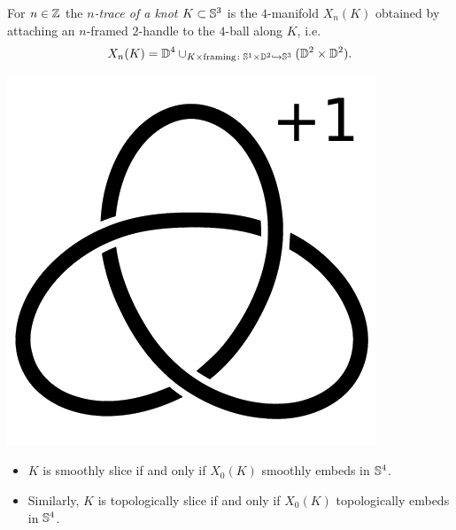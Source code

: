 \begin{definition}
	For $n \in \mathbb{Z}$ the \textit{$n$-trace of a knot} 
	$K \subset \mathbb{S}^{3}$
	is the $4$-manifold $X_{n}(K)$ obtained by attaching an $n$-framed $2$-handle to the $4$-ball along $K$,
	i.e. 
	\begin{equation*}
	X_{n}(K) = \mathbb{D}^{4} \cup_{K \times \textrm{framing} \colon \mathbb{S}^{1} \times \mathbb{D}^{2} \hookrightarrow \mathbb{S}^{3}} (\mathbb{D}^{2} \times \mathbb{D}^{2}).
	\end{equation*}
	
	\begin{marginfigure}
		\begin{center}
			\includegraphics[width=0.5\linewidth]{./pictures/right_handed_trefoil_+1_surgery.pdf}
		\end{center}
		\caption{
			A Kirby diagram for $X_{n}(K)$ is given just by the knot $K$ with the framing $n$ written next to it.
			For example, here is a Kirby diagram representing the $1$-trace
			$X_1(\textrm{right handed trefoil})$.
			The boundary of this $4$-manifold is the $+1$-surgery
			$\sphere{3}_{+1}(\textrm{right handed trefoil})$,
			a possible description of the Poincar\'e homology sphere.}
		\label{fig:right_handed_trefoil_+1_surgery}
	\end{marginfigure}
\end{definition}

\begin{theorem}
	\begin{itemize}
		\item $K$ is smoothly slice if and only if $X_{0}(K)$ smoothly embeds in $\mathbb{S}^{4}$.
		\item Similarly, $K$ is topologically slice if and only if $X_{0}(K)$ topologically
		embeds in $\mathbb{S}^{4}$.
	\end{itemize}
\end{theorem}


